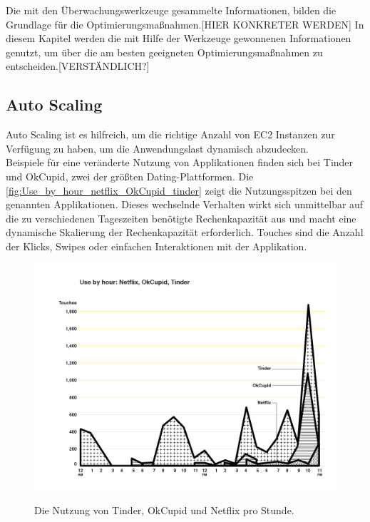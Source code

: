 
Die mit den Überwachungswerkzeuge gesammelte Informationen, bilden die Grundlage für die Optimierungsmaßnahmen.[HIER KONKRETER WERDEN]
In diesem Kapitel werden die mit Hilfe der Werkzeuge gewonnenen Informationen genutzt, um über die am besten geeigneten Optimierungsmaßnahmen zu entscheiden.[VERSTÄNDLICH?]
\subsection{Auto Scaling}%
Auto Scaling ist es hilfreich, um die richtige Anzahl von EC2 Instanzen zur Verfügung zu haben, um die Anwendungslast dynamisch abzudecken.
\\
Beispiele für eine veränderte Nutzung von Applikationen finden sich bei Tinder und OkCupid, zwei der größten Dating-Plattformen. Die \autoref{fig:Use_by_hour_netflix_OkCupid_tinder} zeigt die Nutzungsspitzen bei den genannten Applikationen. Dieses wechselnde Verhalten wirkt sich unmittelbar auf die zu verschiedenen Tageszeiten benötigte Rechenkapazität aus und macht eine dynamische Skalierung der Rechenkapazität erforderlich. Touches sind die Anzahl der Klicks, Swipes oder einfachen Interaktionen mit der Applikation.
\begin{figure}[h]
  \centering
  \includegraphics[scale=0.6]{sources/Use_by_hour_netflix_OkCupid_tinder}
  \caption{}\label{fig:Use_by_hour_netflix_OkCupid_tinder} Die Nutzung von Tinder, OkCupid und Netflix pro Stunde.  
  {\cite{SCOUT1}}
\end{figure}

